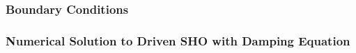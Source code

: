 \subsubsection{Boundary Conditions} %

\subsubsection{Numerical Solution to Driven SHO with Damping Equation}

